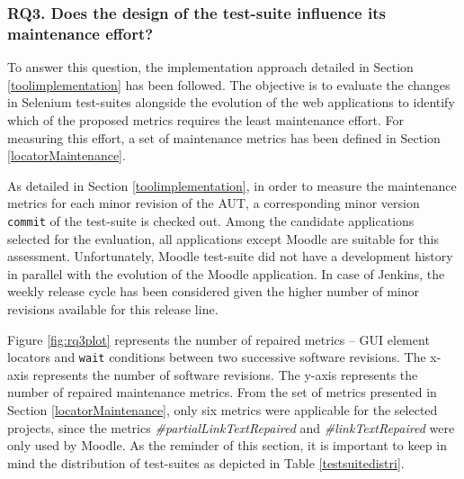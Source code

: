 \subsubsection*{RQ3. Does the design of the test-suite influence its maintenance effort?}

To answer this question, the implementation approach detailed in Section \ref{toolimplementation} has been followed. The objective is to evaluate the changes in Selenium test-suites alongside the evolution of the web applications to identify which of the proposed metrics requires the least maintenance effort. For measuring this effort, a set of maintenance metrics has been defined in Section \ref{locatorMaintenance}.

As detailed in Section \ref{toolimplementation}, in order to measure the maintenance metrics for each minor revision of the AUT, a corresponding minor version \texttt{commit} of the test-suite is checked out. Among the candidate applications selected for the evaluation, all applications except Moodle are suitable for this assessment. Unfortunately, Moodle test-suite did not have a development history in parallel with the evolution of the Moodle application. In case of Jenkins, the weekly release cycle has been considered given the higher number of minor revisions available for this release line.

Figure \ref{fig:rq3plot} represents the number of repaired  metrics -- GUI element locators and \texttt{wait} conditions between two successive software revisions. The x-axis represents the number of software revisions. The y-axis represents the number of repaired maintenance metrics. From the set of metrics presented in Section \ref{locatorMaintenance}, only six metrics were applicable for the selected projects, since the metrics \textit{\#partialLinkTextRepaired} and \textit{\#linkTextRepaired} were only used by Moodle. As the reminder of this section, it is important to keep in mind the distribution of test-suites as depicted in Table \ref{testsuitedistri}.

